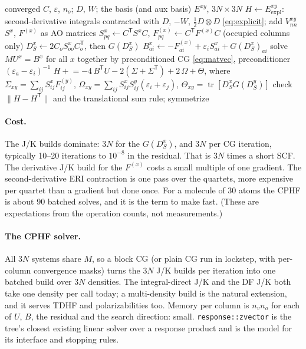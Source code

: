 \documentclass[11pt]{article}
\newcommand{\code}[1]{\texttt{#1}}
\newcommand{\eps}{\varepsilon}
\newcommand{\tr}{\operatorname{tr}}
\newcommand{\Fsk}[1]{F^{(#1)}}
\newcommand{\Exy}{E^{xy}}
\newcommand{\Dsk}[1]{D_S^{#1}}
\begin{document}
\begin{algorithm}[ht]
\caption{RHF analytic Hessian (symmetric form \eqref{eq:hess-sym})}
\label{alg:hessian}
\begin{algorithmic}[1]
\Require converged $C$, $\eps$, $n_o$; $D$, $W$; the basis (and aux basis)
\Ensure $\Exy$, $3N\times3N$
\State $H \gets \Exy_{\mathrm{expl}}$: second-derivative integrals contracted
       with $D$, $-W$, $\frac12 D\otimes D$ \eqref{eq:explicit}; add $V_{nn}^{xy}$
  \State $S^x$, $\Fsk{x}$ as AO matrices 
  \State $S^x_{pq} \gets C^{\mathsf T} S^x C$,\;
         $\Fsk{x}_{pq} \gets C^{\mathsf T}\Fsk{x}C$ (occupied columns only)
  \State $\Dsk{x} \gets 2C_oS^x_{oo}C_o^{\mathsf T}$, then $G(\Dsk{x})$
  \State $B^x_{ai} \gets -\Fsk{x}_{ai} + \eps_iS^x_{ai} + G(\Dsk{x})_{ai}$
\EndFor
\State solve $MU^x = B^x$ for all $x$ together by preconditioned CG
       \eqref{eq:matvec}, preconditioner $(\eps_a-\eps_i)^{-1}$
\State $H \mathrel{+}= -4\,B^{\mathsf T}U
  - 2(\Sigma + \Sigma^{\mathsf T})
  + 2\,\Omega + \Theta$, where
  $\Sigma_{xy} = \sum_{ij}S^x_{ij}\Fsk{y}_{ij}$,
  $\Omega_{xy} = \sum_{ij}S^x_{ij}S^y_{ij}(\eps_i+\eps_j)$,
  $\Theta_{xy} = \tr[\Dsk{x}G(\Dsk{y})]$
\State check $\|H - H^{\mathsf T}\|$ and the translational sum rule; symmetrize
\end{algorithmic}
\end{algorithm}

\paragraph{Cost.} The J/K builds dominate: $3N$ for the $G(\Dsk{x})$, and
$3N$ per CG iteration, typically 10--20 iterations to $10^{-8}$ in the
residual. That is $3N$ times a short SCF. The derivative J/K build for the
$\Fsk{x}$ costs a small multiple of one gradient. The second-derivative
ERI contraction is one pass over the quartets, more expensive per quartet
than a gradient but done once. For a molecule of 30 atoms the CPHF is
about 90 batched solves, and it is the term to make fast. (These are
expectations from the operation counts, not measurements.)

\paragraph{The CPHF solver.} All $3N$ systems share $M$, so a block CG (or
plain CG run in lockstep, with per-column convergence masks) turns the
$3N$ J/K builds per iteration into one batched build over $3N$ densities.
The integral-direct J/K and the DF J/K both take one density per call
today; a multi-density build is the natural extension, and it serves
TDHF and polarizabilities too. Memory per column is $n_vn_o$ for each of
$U$, $B$, the residual and the search direction: small.
\code{response::zvector} is the tree's closest existing linear solver over
a response product and is the model for its interface and stopping rules.
\end{document}
